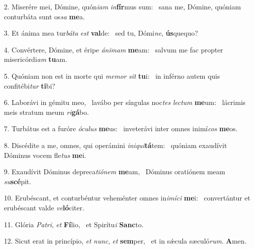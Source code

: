 2. Miserére mei, Dómine, quón\textit{i}\textit{am} \textit{in}\textbf{fír}mus sum: \ast\  sana me, Dómine, quóniam conturbáta sunt os\textit{sa} \textbf{me}a.\

3. Et ánima mea tur\textit{bá}\textit{ta} \textit{est} \textbf{val}de: \ast\  sed tu, Dómi\textit{ne}, \textbf{ús}quequo?\

4. Convértere, Dómine, et éripe \textit{á}\textit{ni}\textit{mam} \textbf{me}am: \ast\  salvum me fac propter misericórdi\textit{am} \textbf{tu}am.\

5. Quóniam non est in morte qui \textit{me}\textit{mor} \textit{sit} \textbf{tu}i: \ast\  in inférno autem quis confitébi\textit{tur} \textbf{ti}bi?\

6. Laborávi in gémitu meo, \dag\  lavábo per síngulas noc\textit{tes} \textit{lec}\textit{tum} \textbf{me}um: \ast\  lácrimis meis stratum meum \textit{ri}\textbf{gá}bo.\

7. Turbátus est a furóre \textit{ó}\textit{cu}\textit{lus} \textbf{me}us: \ast\  inveterávi inter omnes inimí\textit{cos} \textbf{me}os.\

8. Discédite a me, omnes, qui operámini \textit{in}\textit{i}\textit{qui}\textbf{tá}tem: \ast\  quóniam exaudívit Dóminus vocem fle\textit{tus} \textbf{me}i.\

9. Exaudívit Dóminus depreca\textit{ti}\textit{ó}\textit{nem} \textbf{me}am, \ast\  Dóminus oratiónem meam \textit{su}\textbf{scé}pit.\

10. Erubéscant, et conturbéntur veheménter omnes in\textit{i}\textit{mí}\textit{ci} \textbf{me}i: \ast\  convertántur et erubéscant valde \textit{ve}\textbf{ló}citer.\

11. Glória \textit{Pa}\textit{tri}, \textit{et} \textbf{Fí}lio, \ast\  et Spirítu\textit{i} \textbf{Sanc}to.\

12. Sicut erat in princípio, \textit{et} \textit{nunc}, \textit{et} \textbf{sem}per, \ast\  et in sǽcula sæculó\textit{rum}. \textbf{A}men.\

